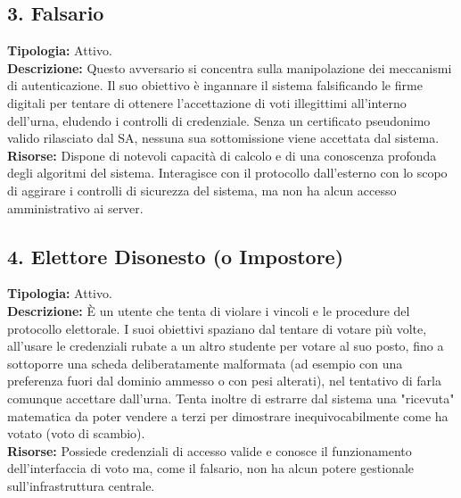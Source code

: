 \subsection*{3. Falsario}
\textbf{Tipologia:} Attivo. \\
\textbf{Descrizione:} Questo avversario si concentra sulla manipolazione dei meccanismi di autenticazione. Il suo obiettivo è ingannare il sistema falsificando le firme digitali per tentare di ottenere l'accettazione di voti illegittimi all'interno dell'urna, eludendo i controlli di credenziale. Senza un certificato pseudonimo valido rilasciato dal SA, nessuna sua sottomissione viene accettata dal sistema. \\
\textbf{Risorse:} Dispone di notevoli capacità di calcolo e di una conoscenza profonda degli algoritmi del sistema. Interagisce con il protocollo dall'esterno con lo scopo di aggirare i controlli di sicurezza del sistema, ma non ha alcun accesso amministrativo ai server.

\subsection*{4. Elettore Disonesto (o Impostore)}
\textbf{Tipologia:} Attivo. \\
\textbf{Descrizione:} È un utente che tenta di violare i vincoli e le procedure del protocollo elettorale. I suoi obiettivi spaziano dal tentare di votare più volte, all'usare le credenziali rubate a un altro studente per votare al suo posto, fino a sottoporre una scheda deliberatamente malformata (ad esempio con una preferenza fuori dal dominio ammesso o con pesi alterati), nel tentativo di farla comunque accettare dall'urna. Tenta inoltre di estrarre dal sistema una "ricevuta" matematica da poter vendere a terzi per dimostrare inequivocabilmente come ha votato (voto di scambio). \\
\textbf{Risorse:} Possiede credenziali di accesso valide e conosce il funzionamento dell'interfaccia di voto ma, come il falsario, non ha alcun potere gestionale sull'infrastruttura centrale.

